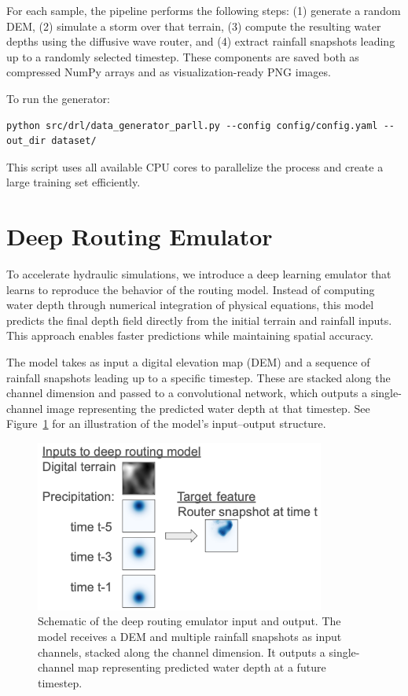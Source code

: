 \documentclass{article}
\begin{document}
For each sample, the pipeline performs the following steps: (1) generate a random DEM, (2) simulate a storm over that terrain, (3) compute the resulting water depths using the diffusive wave router, and (4) extract rainfall snapshots leading up to a randomly selected timestep. These components are saved both as compressed NumPy arrays and as visualization-ready PNG images.

To run the generator:
\begin{verbatim}
python src/drl/data_generator_parll.py --config config/config.yaml --out_dir dataset/
\end{verbatim}

This script uses all available CPU cores to parallelize the process and create a large training set efficiently.

\section{Deep Routing Emulator}
\label{sec:deeprouting}

To accelerate hydraulic simulations, we introduce a deep learning emulator that learns to reproduce the behavior of the routing model. Instead of computing water depth through numerical integration of physical equations, this model predicts the final depth field directly from the initial terrain and rainfall inputs. This approach enables faster predictions while maintaining spatial accuracy.

The model takes as input a digital elevation map (DEM) and a sequence of rainfall snapshots leading up to a specific timestep. These are stacked along the channel dimension and passed to a convolutional network, which outputs a single-channel image representing the predicted water depth at that timestep. See Figure~\ref{fig:model_io} for an illustration of the model's input–output structure.

\begin{figure}[H]
    \centering
    \includegraphics[width=0.85\textwidth]{fig/modelio.png}
    \caption{Schematic of the deep routing emulator input and output. The model receives a DEM and multiple rainfall snapshots as input channels, stacked along the channel dimension. It outputs a single-channel map representing predicted water depth at a future timestep.}
    \label{fig:model_io}
\end{figure}
\end{document}
